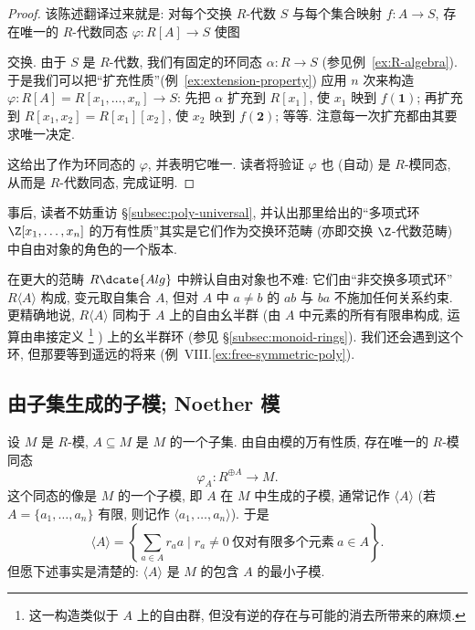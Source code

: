 \begin{proof}
该陈述翻译过来就是: 对每个交换 $R$-代数 $S$ 与每个集合映射 $f : A \to S$, 存在唯一的 $R$-代数同态 $\varphi : R[A] \to S$ 使图
\begin{center}
\end{center}
交换. 由于 $S$ 是 $R$-代数, 我们有固定的环同态 $\alpha : R \to S$ (参见例~\ref{ex:R-algebra}). 于是我们可以把``扩充性质''(例~\ref{ex:extension-property}) 应用 $n$ 次来构造 $\varphi : R[A] = R[x_1, \ldots, x_n] \to S$: 先把 $\alpha$ 扩充到 $R[x_1]$, 使 $x_1$ 映到 $f(\mathbf{1})$; 再扩充到 $R[x_1, x_2] = R[x_1][x_2]$, 使 $x_2$ 映到 $f(\mathbf{2})$; 等等. 注意每一次扩充都由其要求唯一决定.

这给出了作为环同态的 $\varphi$, 并表明它唯一. 读者将验证 $\varphi$ 也 (自动) 是 $R$-模同态, 从而是 $R$-代数同态, 完成证明.
\end{proof}

事后, 读者不妨重访 \S\ref{subsec:poly-universal}, 并认出那里给出的``多项式环 $\Z[x_1, \ldots, x_n]$ 的万有性质''其实是它们作为交换环范畴 (亦即交换 $\Z$-代数范畴) 中自由对象的角色的一个版本.

在更大的范畴 $R\dcate{Alg}$ 中辨认自由对象也不难: 它们由``非交换多项式环''$R\langle A \rangle$ 构成, 变元取自集合 $A$, 但对 $A$ 中 $a \neq b$ 的 $ab$ 与 $ba$ 不施加任何关系约束. 更精确地说, $R\langle A \rangle$ 同构于 $A$ 上的自由幺半群 (由 $A$ 中元素的所有有限串构成, 运算由串接定义%
\footnote{这一构造类似于 $A$ 上的自由群, 但没有逆的存在与可能的消去所带来的麻烦.}%
) 上的幺半群环 (参见 \S\ref{subsec:monoid-rings}). 我们还会遇到这个环, 但那要等到遥远的将来 (例~VIII.\ref{ex:free-symmetric-poly}).

\subsection{由子集生成的子模; Noether 模}
\label{subsec:noetherian-modules}

设 $M$ 是 $R$-模, $A \subseteq M$ 是 $M$ 的一个子集. 由自由模的万有性质, 存在唯一的 $R$-模同态
\[
\varphi_A : R^{\oplus A} \to M.
\]
这个同态的像是 $M$ 的一个子模, 即 $A$ 在 $M$ 中生成的子模, 通常记作 $\langle A \rangle$ (若 $A = \{a_1, \ldots, a_n\}$ 有限, 则记作 $\langle a_1, \ldots, a_n \rangle$). 于是
\[
\langle A \rangle = \left\{\sum_{a \in A} r_a a \mid r_a \neq 0 \ \text{仅对有限多个元素}\ a \in A\right\}.
\]
但愿下述事实是清楚的: $\langle A \rangle$ 是 $M$ 的包含 $A$ 的最小子模.

